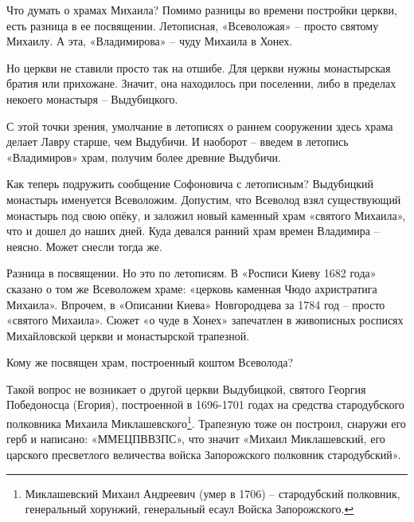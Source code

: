 

Что думать о храмах Михаила? Помимо разницы во времени постройки церкви, есть разница в ее посвящении. Летописная, «Всеволожая» – просто святому Михаилу. А эта, «Владимирова» – чуду Михаила в Хонех.

Но церкви не ставили просто так на отшибе. Для церкви нужны монастырская братия или прихожане. Значит, она находилось при поселении, либо в пределах некоего монастыря – Выдубицкого.

С этой точки зрения, умолчание в летописях о раннем сооружении здесь храма делает Лавру старше, чем Выдубичи. И наоборот – введем в летопись «Владимиров» храм, получим более древние Выдубичи.

Как теперь подружить сообщение Софоновича с летописным? Выдубицкий монастырь именуется Всеволожим. Допустим, что Всеволод взял существующий монастырь под свою опёку, и заложил новый каменный храм «святого Михаила», что и дошел до наших дней. Куда девался ранний храм времен Владимира – неясно. Может снесли тогда же.

Разница в посвящении. Но это по летописям. В «Росписи Киеву 1682 года» сказано о том же Всеволожем храме: «церковь каменная Чюдо ахристратига Михаила». Впрочем, в «Описании Киева» Новгородцева за 1784 год – просто «святого Михаила». Сюжет «о чуде в Хонех» запечатлен в живописных росписях Михайловской церкви и монастырской трапезной.

Кому же посвящен храм, построенный коштом Всеволода? 

Такой вопрос не возникает о другой церкви Выдубицкой, святого Георгия Победоносца (Егория), построенной в 1696-1701 годах на средства стародубского полковника Михаила Миклашевского\footnote{Миклашевский Михаил Андреевич (умер в 1706) – стародубский полковник, генеральный хорунжий, генеральный есаул Войска Запорожского.}. Трапезную тоже он построил, снаружи его герб и написано: «ММЕЦПВВЗПС», что значит «Михаил Миклашевский, его царского пресветлого величества войска Запорожского полковник стародубский». 

